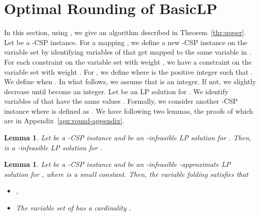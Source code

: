 \documentclass[letterpaper, 11pt]{article}
\newtheorem{lemma}[theorem]{Lemma}
\newcommand{\blp}{\textsf{BasicLP}\xspace}
\begin{document}
\section{Optimal Rounding of \blp}\label{sec:round}
In this section, using , we give an algorithm described in Theorem~\ref{thr:upper}.
Let  be a -CSP instance.
For a mapping , 
we define a new -CSP instance  on the variable set  by identifying variables of  that get mapped to the same variable in .
For each constraint  on the variable set  with weight ,
we have a constraint  on the variable set  with weight .
For , 
we define  where  is the positive integer such that .
We define  when .
In what follows, we assume that  is an integer.
If not, we slightly decrease  until  become an integer.
Let  be an LP solution for .
We identify variables  of  that have the same values .
Formally, we consider another -CSP instance  
where  is defined as .
We have following two lemmas, the proofs of which are in Appendix~\ref{apx:round-appendix}.
\begin{lemma}\label{lmm:discretize}
  Let  be a -CSP instance and  be an -infeasible LP solution for .
  Then,  is a -infeasible LP solution for .
\end{lemma}
\begin{lemma}\label{lmm:compression}
  Let  be a -CSP instance and  be an -infeasible -approximate LP solution for ,
  where  is a small constant.
  Then, the variable folding  satisfies that
  \begin{itemize}
    \setlength{\itemsep}{0pt}
  \item ,
  \item The variable set of  has a cardinality .
  \end{itemize}
\end{lemma}
\end{document}
